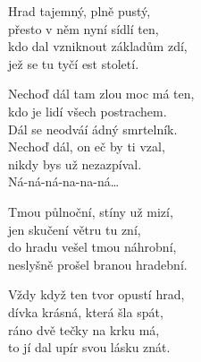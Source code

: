 
\ve{}
Hrad tajemný, plně pustý,\\
přesto v něm nyní sídlí ten,\\
kdo dal vzniknout základům zdí,\\
jež se tu tyčí est století.

\cho{}           
Nechoď dál tam zlou moc má ten,\\
kdo je lidí všech postrachem.\\
Dál se neodváí ádný smrtelník.\\         
Nechoď dál, on eč by ti vzal,\\
nikdy bys už nezazpíval.\\
Ná-ná-ná-na-na-ná\ldots {}

\ve{}
Tmou půlnoční, stíny už mizí,\\
jen skučení větru tu zní,\\
do hradu vešel tmou náhrobní,\\
neslyšně prošel branou hradební.

\cho{}

\ve{}
Vždy když ten tvor opustí hrad,\\
dívka krásná, která šla spát,\\
ráno dvě tečky na krku má,\\
to jí dal upír svou lásku znát.

\cho{}

\esong{}